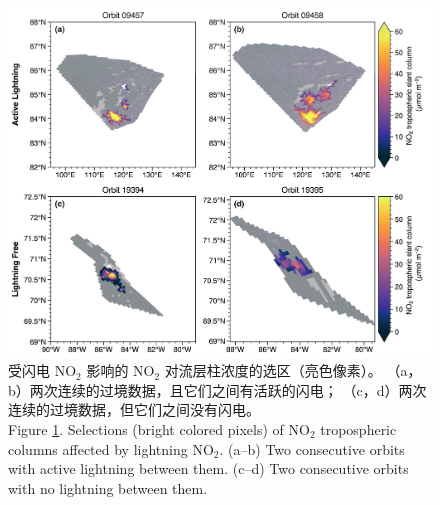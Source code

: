 \begin{figure}[!htbp]
\centering
\includegraphics[width=13cm]{./figures/arctic_consecutive_orbits.png}
\caption{
受闪电 NO$_2$ 影响的 NO$_2$ 对流层柱浓度的选区（亮色像素）。
（a，b）两次连续的过境数据，且它们之间有活跃的闪电；
（c，d）两次连续的过境数据，但它们之间没有闪电。\\
Figure \ref{fig:consecutive_orbits}.
Selections (bright colored pixels) of NO$_2$ tropospheric columns affected by lightning NO$_2$.
(a--b) Two consecutive orbits with active lightning between them.
(c--d) Two consecutive orbits with no lightning between them.
}
\label{fig:consecutive_orbits}
\end{figure}


